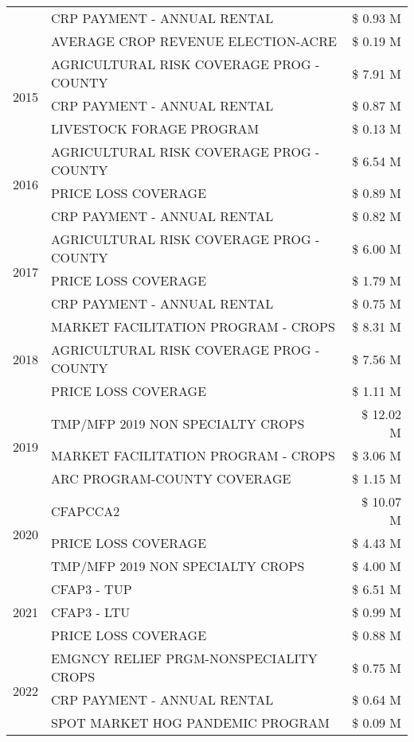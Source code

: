 \begin{tabular}{llr}
 & CRP PAYMENT - ANNUAL RENTAL & \$ 0.93 M \\
 & AVERAGE CROP REVENUE ELECTION-ACRE & \$ 0.19 M \\
\cline{1-3}
\multirow[t]{3}{*}{2015} & AGRICULTURAL RISK COVERAGE PROG - COUNTY & \$ 7.91 M \\
 & CRP PAYMENT - ANNUAL RENTAL & \$ 0.87 M \\
 & LIVESTOCK FORAGE PROGRAM & \$ 0.13 M \\
\cline{1-3}
\multirow[t]{3}{*}{2016} & AGRICULTURAL RISK COVERAGE PROG - COUNTY & \$ 6.54 M \\
 & PRICE LOSS COVERAGE & \$ 0.89 M \\
 & CRP PAYMENT - ANNUAL RENTAL & \$ 0.82 M \\
\cline{1-3}
\multirow[t]{3}{*}{2017} & AGRICULTURAL RISK COVERAGE PROG - COUNTY & \$ 6.00 M \\
 & PRICE LOSS COVERAGE & \$ 1.79 M \\
 & CRP PAYMENT - ANNUAL RENTAL & \$ 0.75 M \\
\cline{1-3}
\multirow[t]{3}{*}{2018} & MARKET FACILITATION PROGRAM - CROPS & \$ 8.31 M \\
 & AGRICULTURAL RISK COVERAGE PROG - COUNTY & \$ 7.56 M \\
 & PRICE LOSS COVERAGE & \$ 1.11 M \\
\cline{1-3}
\multirow[t]{3}{*}{2019} & TMP/MFP 2019 NON SPECIALTY CROPS & \$ 12.02 M \\
 & MARKET FACILITATION PROGRAM - CROPS & \$ 3.06 M \\
 & ARC PROGRAM-COUNTY COVERAGE & \$ 1.15 M \\
\cline{1-3}
\multirow[t]{3}{*}{2020} & CFAPCCA2 & \$ 10.07 M \\
 & PRICE LOSS COVERAGE & \$ 4.43 M \\
 & TMP/MFP 2019 NON SPECIALTY CROPS & \$ 4.00 M \\
\cline{1-3}
\multirow[t]{3}{*}{2021} & CFAP3 - TUP & \$ 6.51 M \\
 & CFAP3 - LTU & \$ 0.99 M \\
 & PRICE LOSS COVERAGE & \$ 0.88 M \\
\cline{1-3}
\multirow[t]{3}{*}{2022} & EMGNCY RELIEF PRGM-NONSPECIALITY CROPS & \$ 0.75 M \\
 & CRP PAYMENT - ANNUAL RENTAL & \$ 0.64 M \\
 & SPOT MARKET HOG PANDEMIC PROGRAM & \$ 0.09 M \\
\cline{1-3}
\bottomrule
\end{tabular}
